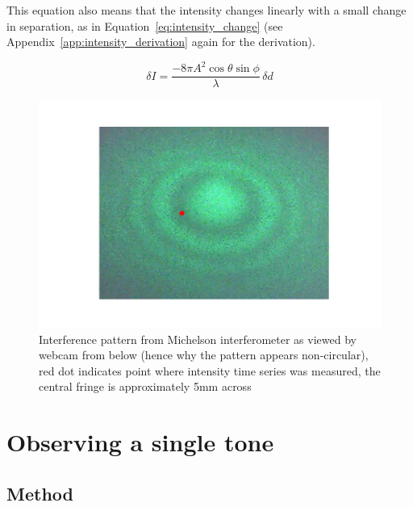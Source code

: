 \documentclass[prb,preprint]{revtex4-1}
\begin{document}
This equation also means that the intensity changes linearly with a small change in separation, as in Equation~\ref{eq:intensity_change} (see Appendix~\ref{app:intensity_derivation} again for the derivation).

\begin{equation}
\label{eq:intensity_change}
	\delta I = \frac{- 8 \pi A^2 \cos{\theta} \sin{\phi}}{\lambda}\, \delta d
\end{equation}

\begin{figure}
	\includegraphics[width=\textwidth]{figures/webcam_still0.pdf}
	\caption{Interference pattern from Michelson interferometer as viewed by webcam from below (hence why the pattern appears non-circular), red dot indicates point where intensity time series was measured, the central fringe is approximately 5mm across}
	\label{fig:interference_pattern}
\end{figure}



\section{Observing a single tone}
\label{sec:single_tone}

\subsection{Method}
\end{document}
